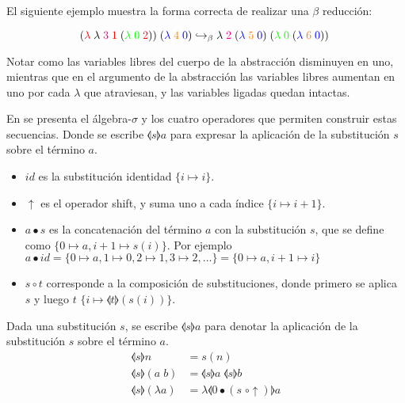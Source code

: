 El siguiente ejemplo muestra la forma correcta de realizar una $\beta$ reducción:

\[
(\textcolor{red}{\lambda}\; \lambda\; \textcolor{magenta}{3}\; \textcolor{red}{1}\; (\textcolor{green}{\lambda\; 0}\; \textcolor{red}{2}))\; (\textcolor{blue}{\lambda}\; \textcolor{orange}{4}\; \textcolor{blue}{0})
\hookrightarrow_\beta
\lambda \; \textcolor{magenta}{2} \; (\textcolor{blue}{\lambda}\; \textcolor{orange}{5}\; \textcolor{blue}{0})\; (\textcolor{green}{\lambda\; 0}\; (\textcolor{blue}{\lambda}\; \textcolor{orange}{6}\; \textcolor{blue}{0}))\;
\]

Notar como las variables libres del cuerpo de la abstracción disminuyen en uno, mientras que en el argumento de la abstracción las variables libres aumentan en uno por cada $\lambda$ que atraviesan, y las variables ligadas quedan intactas.

En \cite{explicit_subs} se presenta el álgebra-$\sigma$ y los cuatro operadores que permiten construir estas secuencias.
Donde se escribe $\llangle s \rrangle a$ para expresar la aplicación de la substitución $s$ sobre el término $a$.

\begin{itemize}
	\item $id$ es la substitución identidad $\{i \mapsto i\}$.
	\item $\uparrow$ es el operador shift, y suma uno a cada índice $\{i \mapsto i+1\}$.
	\item $a \bullet s$ es la concatenación del término $a$ con la substitución $s$, que se define como $\{0 \mapsto a, i+1 \mapsto s(i)\}$. Por ejemplo $a \bullet id = \{ 0 \mapsto a, 1 \mapsto 0, 2 \mapsto 1, 3 \mapsto 2, \dots \} = \{ 0 \mapsto a, i+1 \mapsto i \} $
	\item $s \circ t$ corresponde a la composición de substituciones, donde primero se aplica $s$ y luego $t$ $\{ i \mapsto \llangle t \rrangle (s(i)) \}$.
\end{itemize}

Dada una substitución $s$, se escribe $\llangle s \rrangle a$ para denotar la aplicación de la substitución $s$ sobre el término $a$.
\begin{align*}
	\llangle s \rrangle n &= s(n) \\
	\llangle s \rrangle (a\; b) &= \llangle s \rrangle a\; \llangle s \rrangle b \\
	\llangle s \rrangle (\lambda a) &= \lambda \llangle 0 \bullet (s \; \circ \uparrow) \rrangle a
\end{align*}

